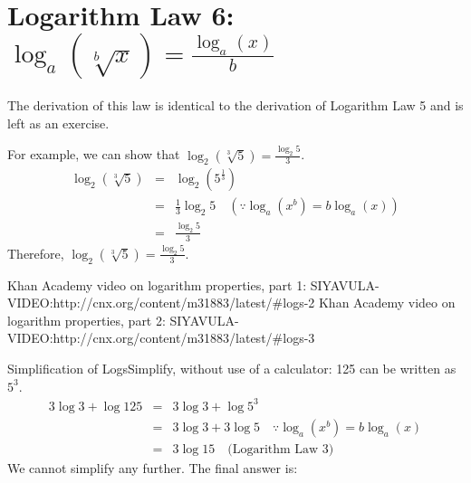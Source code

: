 \section{Logarithm Law 6: $\log_{a}\left(\sqrt[b]{x}\right) = \frac{\log_{a}(x)}{b}$}

The derivation of this law is identical to the derivation of Logarithm Law 5 and is left as an exercise.

For example, we can show that $\log_{2}(\sqrt[3]{5}) = \frac{\log_{2}5}{3} $.
\begin{eqnarray*}
\log_{2}(\sqrt[3]{5}) &=& \log_2 (5^{\frac{1}{3}})\\
&=& \frac{1}{3} \log_2 5 \quad (\because \log_{a}(x^b) = b \log_{a}(x))\\
&=&\frac{\log_{2}5}{3}
\end{eqnarray*}
Therefore, $\log_{2}(\sqrt[3]{5}) = \frac{\log_{2}5}{3}$.


Khan Academy video on logarithm properties, part 1: SIYAVULA-VIDEO:http://cnx.org/content/m31883/latest/#logs-2
Khan Academy video on logarithm properties, part 2: SIYAVULA-VIDEO:http://cnx.org/content/m31883/latest/#logs-3

\begin{wex}{Simplification of Logs}{Simplify, without use of a calculator:
}
{
125 can be written as $5^3$.
\begin{eqnarray*}
3\log 3 + \log 125 &=&3\log 3 + \log 5^3\\
&=&3\log 3 + 3\log 5 \quad \because \log_{a}(x^b) = b \log_{a}(x)\\
&=&3\log 15 \quad \mbox{(Logarithm Law 3)}
\end{eqnarray*}
We cannot simplify any further. The final answer is:
}\end{wex}

